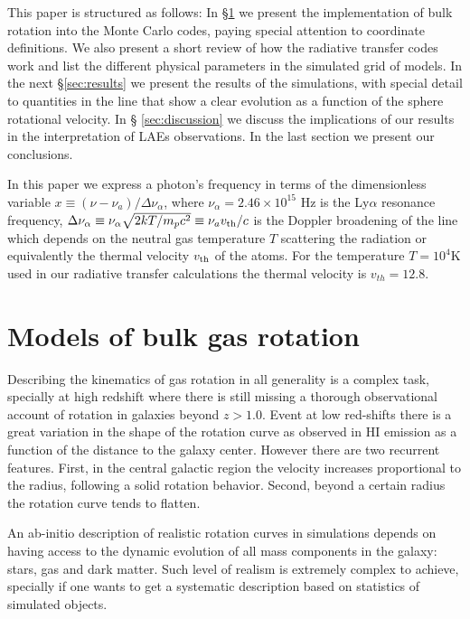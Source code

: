 \documentclass{emulateapj}
\newcommand{\ly}{{\ifmmode{{\rm Ly}\alpha~}\else{Ly$\alpha$~}\fi}}
\newcommand{\kms}{{\ifmmode{{\mathrm{\,km\ s}^{-1}}}\else{\,km~s$^{-1}$}\fi}}
\begin{document}
 
This paper is structured as follows: In \S \ref{sec:implementation} we
present the implementation of bulk rotation into the Monte Carlo
codes, paying special attention to coordinate definitions. We also
present a short review of how the \ly radiative transfer codes work
and list the different physical parameters in the simulated grid of
models. In the next \S \ref{sec:results} we present the results of the
simulations, with special detail to quantities in the line that show a
clear evolution as a function of the sphere rotational velocity. In \S
\ref{sec:discussion} we discuss the implications of our results in the
interpretation of LAEs observations. In the last section we present
our conclusions.  

In this paper we express a photon's frequency in terms of the
dimensionless variable $x\equiv (\nu -\nu_a)/\Delta\nu_\alpha$, where
$\nu_{\alpha}=2.46\times 10^{15}$ Hz is the Ly$\alpha$ resonance
frequency,  $\Delta\nu_{\alpha} \equiv
\nu_{\alpha}\sqrt{2kT/m_pc^2}\equiv \nu_av_{\rm th}/c $ is the Doppler
broadening of the line which depends on the neutral gas temperature
$T$ scattering the radiation or equivalently the thermal velocity
$v_{\rm th}$ of the atoms.  For the temperature $T=10^4$K used in our
radiative transfer calculations the thermal velocity is
$v_{th}=12.8$\kms.  




\section{Models of bulk gas rotation}
\label{sec:implementation}

Describing the kinematics of gas rotation in all generality is a
complex task, specially at high redshift where there is still missing
a thorough observational account of rotation in galaxies beyond
$z>1.0$. Event at low red-shifts there is a great
variation in the shape of the rotation curve as observed in HI
emission as a function of the distance to the galaxy center. However
there are two recurrent features. First, in the
central galactic region the velocity increases proportional to the radius,
following a solid rotation behavior. Second, beyond a certain radius
the rotation curve tends to flatten.  

An ab-initio description of realistic rotation curves in simulations
depends on having access to the dynamic evolution of all mass components
in the galaxy: stars, gas and dark matter. Such level of realism is
extremely complex to achieve, specially if one wants to get a
systematic description based on statistics of simulated objects.
\end{document}
